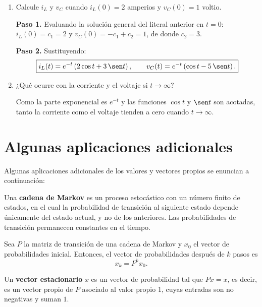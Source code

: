 \begin{prob}
\begin{enumerate}[$(a)$]
\item Calcule $i_{L}$ y $v_{C}$ cuando $i_{L}(0)=2$ amperios y $v_{C}(0)=1$ voltio.
\begin{myproof}
\textbf{Paso 1.} Evaluando la solución general del literal anterior en $t=0$: $i_L(0) = c_1 = 2$ y $v_C(0) = -c_1 + c_2 = 1$, de donde $c_2 = 3$.

\textbf{Paso 2.} Sustituyendo:
\[
\boxed{i_L(t) = e^{-t}\left(2\cos t + 3\,\sen t\right), \qquad
v_C(t) = e^{-t}\left(\cos t - 5\,\sen t\right).}
\]
\end{myproof}

\item ¿Qué ocurre con la corriente y el voltaje si $t\to \infty$? 
\begin{myproof}
Como la parte exponencial es $e^{-t}$ y las funciones $\cos t$ y $\sen t$ son acotadas, tanto la corriente como el voltaje tienden a cero cuando $t\to\infty$.
\end{myproof}
\end{enumerate}
\end{prob}

\section{Algunas aplicaciones adicionales}

Algunas aplicaciones adicionales de los valores y vectores propios se enuncian a continuación:

\begin{definition}
Una \textbf{cadena de Markov} es un proceso estocástico con un número finito de estados, en el cual la probabilidad de transición al siguiente estado depende únicamente del estado actual, y no de los anteriores. Las probabilidades de transición permanecen constantes en el tiempo.
\end{definition}

\begin{theorem}
Sea $P$ la matriz de transición de una cadena de Markov y $x_0$ el vector de probabilidades inicial. Entonces, el vector de probabilidades después de $k$ pasos es
\[
x_k = P^k x_0.
\]
\end{theorem}

\begin{definition}
Un \textbf{vector estacionario} $x$ es un vector de probabilidad tal que $Px = x$, es decir, es un vector propio de $P$ asociado al valor propio $1$, cuyas entradas son no negativas y suman $1$.
\end{definition}

